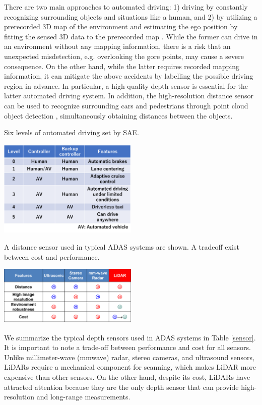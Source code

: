 \documentclass[paper]{ieice}
\begin{document}
There are two main approaches to automated driving: 1) driving by constantly recognizing surrounding objects and situations like a human\cite{tesla}, and 2) by utilizing a prerecorded 3D map of the environment and estimating the ego position by fitting the sensed 3D data to the prerecorded map \cite{montemerlo2008junior}. While the former can drive in an environment without any mapping information, there is a risk that an unexpected misdetection, e.g. overlooking the gore points, may cause a severe consequence. On the other hand, while the latter requires recorded mapping information, it can mitigate the above accidents by labelling the possible driving region in advance. 
In particular, a high-quality depth sensor is essential for the latter automated driving system. In addition, the high-resolution distance sensor can be used to recognize surrounding cars and pedestrians through point cloud object detection \cite{lang2019pointpillars, qi2018frustum},  simultaneously obtaining distances between the objects.

\begin{table}[!t]
\centering
\caption{Six levels of automated driving set by SAE.}
 \includegraphics[width=0.5\textwidth]{figs/ses.png}
\label{sae}
\end{table}

\begin{table}[!t]
\centering
\caption{A distance sensor used in typical ADAS systems are shown. A tradeoff exist between cost and performance.}
 \includegraphics[width=0.5\textwidth]{figs/distancesensor.png}
\label{sensor}
\end{table}

We summarize the typical depth sensors used in ADAS systems in Table \ref{sensor}. It is important to note a trade-off between performance and cost for all sensors.
Unlike millimeter-wave (mmwave) radar, stereo cameras, and ultrasound sensors, LiDARs require a mechanical component for scanning, which makes LiDAR more expensive than other sensors. On the other hand, despite its cost, LiDARs have attracted attention because they are the only depth sensor that can provide high-resolution and long-range measurements.
\end{document}

